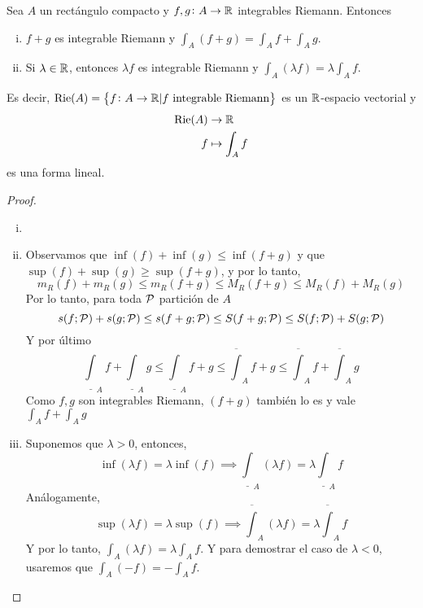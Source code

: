 \begin{prop}[Linealidad]\label{prop:lin_int}
    Sea $A$ un rectángulo compacto y $f,g \colon A \to \mathbb{R}$ integrables Riemann.
    Entonces
    \begin{enumerate}[i)]
        \item $f+g$ es integrable Riemann y $\int_A (f+g) = \int_A f+\int_A g$.
        \item Si $\lambda \in \mathbb{R}$, entonces $\lambda f$ es integrable
            Riemann y $\int_A (\lambda f) = \lambda \int_A f$.
    \end{enumerate}

    Es decir, $\text{Rie}(A) = \left\{f \colon A \to \mathbb{R} \vert f \text{ integrable
    Riemann}\right\}$ es un $\mathbb{R}$-espacio vectorial y
    \[
        \begin{aligned}
            \text{Rie}(A) &\to \mathbb{R} \\ f &\mapsto \int_A f
        \end{aligned}
    \]
    es una forma lineal.
\end{prop}
\begin{proof}
    \begin{enumerate}[i)]
      \item[]
      \item Observamos que $\inf(f) + \inf(g) \leq \inf(f+g)$ y que
            $\sup(f)+\sup(g) \geq \sup(f+g)$, y por lo tanto,
            \[
                m_R(f) + m_R(g) \leq m_R(f+g) \leq M_R(f+g) \leq
                M_R(f) + M_R(g)
            \]
            Por lo tanto, para toda $\mathcal{P}$ partición de $A$
            \[
                s(f;\mathcal{P}) + s(g;\mathcal{P}) \leq s(f+g;\mathcal{P}) \leq S(f+g;\mathcal{P})
                \leq S(f;\mathcal{P}) + S(g;\mathcal{P})
            \]
            Y por último
            \[
                \underline{\int}_A f + \underline{\int}_A g \leq
                \underline{\int}_A f+g \leq \overline{\int}_A f+g \leq
                \overline{\int}_A f + \overline{\int}_A g
            \]
            Como $f,g$ son integrables Riemann, $(f+g)$ también lo es
            y vale $\int_A f + \int_A g$
        \item Suponemos que $\lambda > 0$, entonces,
            \[
                \inf (\lambda f) = \lambda \inf (f) \implies
                \underline{\int}_A (\lambda f) = \lambda
                \underline{\int}_A f
            \]
            Análogamente,
            \[
                \sup(\lambda f) = \lambda \sup(f) \implies
                \overline{\int}_A (\lambda f) = \lambda
                \overline{\int}_A f
            \]
            Y por lo tanto, $\int_A (\lambda f) = \lambda \int_A f$.
            Y para demostrar el caso de $\lambda < 0$, usaremos que
            $\int_A (-f) = - \int_A f$.
    \end{enumerate}
\end{proof}

